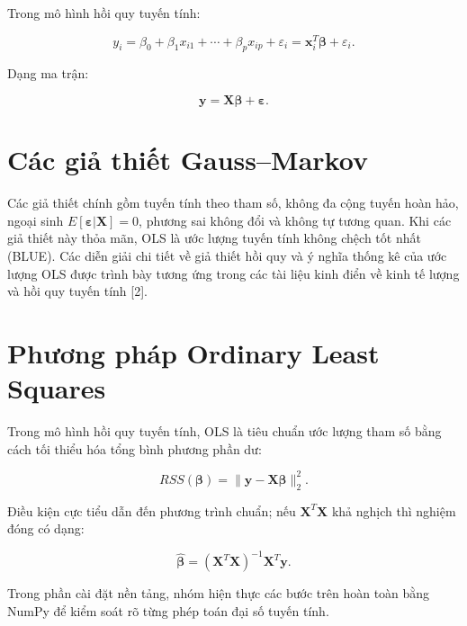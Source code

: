 \documentclass[12pt,a4paper]{article}
\begin{document}
Trong mô hình hồi quy tuyến tính:
\begin{formulabox}
\begin{equation}
    y_i = \beta_0 + \beta_1x_{i1} + \cdots + \beta_px_{ip} + \varepsilon_i
        = \mathbf{x}_i^T\boldsymbol{\beta} + \varepsilon_i.
\end{equation}
\end{formulabox}
Dạng ma trận:
\begin{formulabox}
\begin{equation}
    \mathbf{y} = \mathbf{X}\boldsymbol{\beta} + \boldsymbol{\varepsilon}.
\end{equation}
\end{formulabox}

\section{Các giả thiết Gauss--Markov}
Các giả thiết chính gồm tuyến tính theo tham số, không đa cộng tuyến hoàn hảo, ngoại sinh $E[\boldsymbol{\varepsilon}|\mathbf{X}]=0$, phương sai không đổi và không tự tương quan. Khi các giả thiết này thỏa mãn, OLS là ước lượng tuyến tính không chệch tốt nhất (BLUE).
Các diễn giải chi tiết về giả thiết hồi quy và ý nghĩa thống kê của ước lượng OLS được trình bày tương ứng trong các tài liệu kinh điển về kinh tế lượng và hồi quy tuyến tính [2].

\section{Phương pháp Ordinary Least Squares}
Trong mô hình hồi quy tuyến tính, OLS là tiêu chuẩn ước lượng tham số bằng cách tối thiểu hóa tổng bình phương phần dư:
\begin{formulabox}
\begin{equation}
    RSS(\boldsymbol{\beta}) = \|\mathbf{y} - \mathbf{X}\boldsymbol{\beta}\|_2^2.
\end{equation}
\end{formulabox}
Điều kiện cực tiểu dẫn đến phương trình chuẩn; nếu $\mathbf{X}^T\mathbf{X}$ khả nghịch thì nghiệm đóng có dạng:
\begin{formulabox}
\begin{equation}
    \hat{\boldsymbol{\beta}} = (\mathbf{X}^T\mathbf{X})^{-1}\mathbf{X}^T\mathbf{y}.
    \label{eq:ols}
\end{equation}
\end{formulabox}

Trong phần cài đặt nền tảng, nhóm hiện thực các bước trên hoàn toàn bằng NumPy để kiểm soát rõ từng phép toán đại số tuyến tính.
\end{document}
